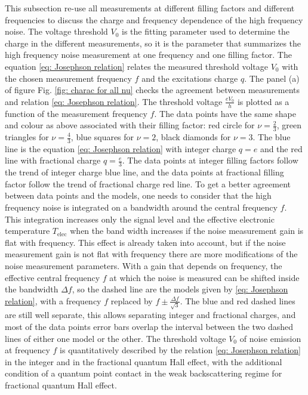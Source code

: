 This subsection re-use all measurements at different filling factors and different frequencies to discuss the charge and frequency dependence of the high frequency noise.
The voltage threshold $V_{0}$ is the fitting parameter used to determine the charge in the different measurements, so it is the parameter that summarizes the high frequency noise measurement at one frequency and one filling factor.
The equation \eqref{eq: Josephson relation} relates the measured threshold voltage $V_{0}$ with the chosen measurement frequency $f$ and the excitations charge $q$.
The panel (a) of figure Fig. \ref{fig: charac for all nu} checks the agreement between measurements and relation \eqref{eq: Josephson relation}.
The threshold voltage $\frac{eV_{0}}{h}$ is plotted as a function of the measurement frequency $f$.
The data points have the same shape and colour as above associated with their filling factor: red circle for $\nu = \frac{2}{3}$, green triangles for $\nu = \frac{4}{3}$, blue squares for $\nu = 2$, black diamonds for $\nu = 3$.
The blue line is the equation \eqref{eq: Josephson relation} with integer charge $q = e$ and the red line with fractional charge $q = \frac{e}{3}$.
The data points at integer filling factors follow the trend of integer charge blue line, and the data points at fractional filling factor follow the trend of fractional charge red line.
To get a better agreement between data points and the models, one needs to consider that the high frequency noise is integrated on a bandwidth around the central frequency $f$.
This integration increases only the signal level and the effective electronic temperature $T_{\mathrm{elec}}$ when the band width increases if the noise measurement gain is flat with frequency.
This effect is already taken into account, but if the noise measurement gain is not flat with frequency there are more modifications of the noise measurement parameters.
With a gain that depends on frequency, the effective central frequency $f$ at which the noise is measured can be shifted inside the bandwidth $\Delta f$, so the dashed line are the models given by \eqref{eq: Josephson relation}, with a frequency $f$ replaced by $f\pm\frac{\Delta f}{\sqrt{3}}$.
The blue and red dashed lines are still well separate, this allows separating integer and fractional charges, and most of the data points error bars overlap the interval between the two dashed lines of either one model or the other. 
The threshold voltage $V_{0}$ of noise emission at frequency $f$ is quantitatively described by the relation \eqref{eq: Josephson relation} in the integer and in the fractional quantum Hall effect, with the additional condition of a quantum point contact in the weak backscattering regime for fractional quantum Hall effect.
